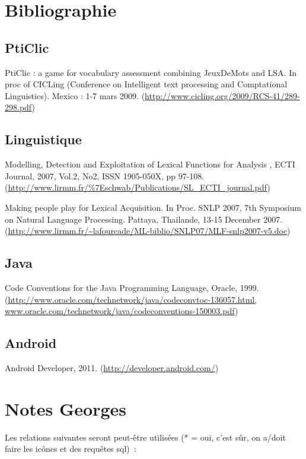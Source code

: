 \documentclass[a4paper,11pt,french]{article}
\begin{document}
\newpage


\section{Bibliographie}
\subsection{PtiClic}

PtiClic : a game for vocabulary assessment combining JeuxDeMots and LSA. In proc of CICLing (Conference on Intelligent text processing and Comptational Linguistics). Mexico : 1-7 mars 2009. (\url{http://www.cicling.org/2009/RCS-41/289-298.pdf})


\subsection{Linguistique}

Modelling, Detection and Exploitation of Lexical Functions for Analysis , ECTI Journal, 2007, Vol.2, No2, ISSN 1905-050X, pp 97-108. (\url{http://www.lirmm.fr/\%7Eschwab/Publications/SL_ECTI_journal.pdf})

Making people play for Lexical Acquisition. In Proc. SNLP 2007, 7th Symposium on Natural Language Processing. Pattaya, Thailande, 13-15 December 2007. (\url{http://www.lirmm.fr/~lafourcade/ML-biblio/SNLP07/MLF-snlp2007-v5.doc})


\subsection{Java}

Code Conventions for the Java Programming Language, Oracle, 1999. (\url{http://www.oracle.com/technetwork/java/codeconvtoc-136057.html, www.oracle.com/technetwork/java/codeconventions-150003.pdf})

\subsection{Android}

Android Developer, 2011. (\url{http://developer.android.com/})




\section{Notes Georges}
Les relations suivantes seront peut-être utilisées (* = oui, c'est sûr, on a/doit faire les icônes et des requêtes sql)~:
\end{document}
